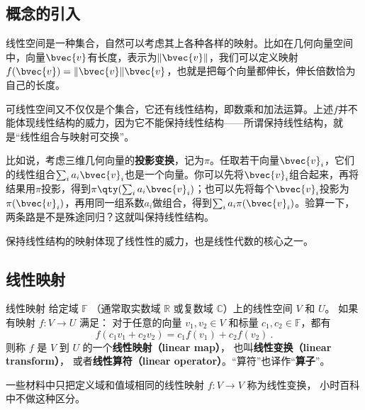 
\begin{issues}
\end{issues}




\subsection{概念的引入}

线性空间是一种集合，自然可以考虑其上各种各样的映射。比如在几何向量空间中，向量$\bvec{v}$有长度，表示为$\lVert \bvec{v} \rVert$，我们可以定义映射$f(\bvec{v})=\lVert \bvec{v} \rVert\bvec{v}$，也就是把每个向量都伸长，伸长倍数恰为自己的长度。

可线性空间又不仅仅是个集合，它还有线性结构，即数乘和加法运算。上述$f$并不能体现线性结构的威力，因为它不能保持线性结构——所谓保持线性结构，就是“线性组合与映射可交换”。

比如说，考虑三维几何向量的\textbf{投影变换}，记为$\pi$。任取若干向量$\bvec{v}_i$，它们的线性组合$\sum_{i}a_i\bvec{v}_i$也是一个向量。你可以先将$\bvec{v}_i$组合起来，再将结果用$\pi$投影，得到$\pi\qty(\sum_{i}a_i\bvec{v}_i)$；也可以先将每个$\bvec{v}_i$投影为$\pi(\bvec{v}_i)$，再用同一组系数$a_i$做组合，得到$\sum_{i}a_i\pi(\bvec{v}_i)$。验算一下，两条路是不是殊途同归？这就叫保持线性结构。

保持线性结构的映射体现了线性性的威力，也是线性代数的核心之一。

\subsection{线性映射}

\begin{definition}{线性映射}\label{def_LinMap_1}
给定域 $\mathbb F$ （通常取实数域 $\mathbb R$ 或复数域 $\mathbb C$）上的线性空间 $V$ 和 $U$。 如果有映射 $f:V\rightarrow U$ 满足： 对于任意的向量 ${v}_1, {v}_2\in V$ 和标量 $c_1, c_2 \in \mathbb{F}$，都有
\begin{equation}
f(c_1 {v}_1+c_2 {v}_2)=c_1f({v}_1)+c_2f({v}_2)~.
\end{equation}
则称 $f$ 是 $V$ 到 $U$ 的一个\textbf{线性映射（linear map）}， 也叫\textbf{线性变换（linear transform）}， 或者\textbf{线性算符（linear operator）}。“算符”也译作“\textbf{算子}”。
\end{definition}
一些材料中只把定义域和值域相同的线性映射 $f:V\to V$ 称为线性变换， 小时百科中不做这种区分。

